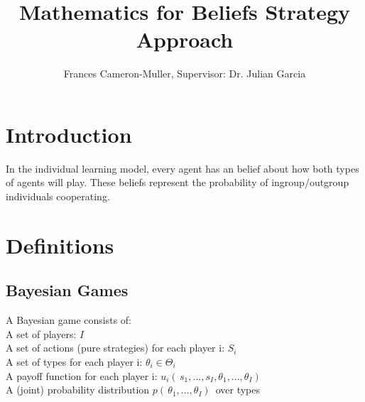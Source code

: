 \documentclass[]{llncs}
\begin{document}
\title{Mathematics for Beliefs Strategy Approach}

\author{Frances Cameron-Muller, Supervisor: Dr. Julian Garcia}


\maketitle    

\section{Introduction}
In the individual learning model, every agent has an belief about how both types of agents will play. These beliefs represent the probability of ingroup/outgroup individuals cooperating. 

\section{Definitions}

\subsection{Bayesian Games} 
A Bayesian game consists of: \\
A set of players: $I$\\
A set of actions (pure strategies) for each player i: $S_i$\\
A set of types for each player i: $\theta_i  \in \Theta_i $ \\
A payoff function for each player i: $u_i(\,s_1, . . . ,s_I, \theta_1, . . . , \theta_I)\,$\\
A (joint) probability distribution $p(\,\theta_1, . . . , \theta_I)\,$ over types 
\end{document}
